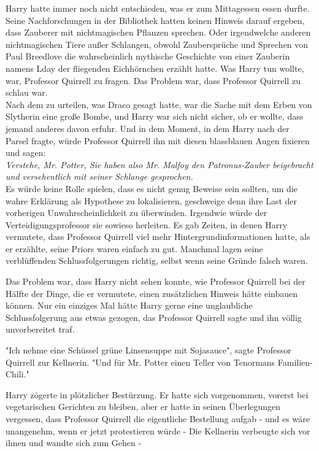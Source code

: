 {Harry hatte immer noch nicht entschieden, was er zum Mittagessen essen durfte. Seine Nachforschungen in der Bibliothek hatten keinen Hinweis darauf ergeben, dass Zauberer mit nichtmagischen Pflanzen sprechen. Oder irgendwelche anderen nichtmagischen Tiere außer Schlangen, obwohl Zaubersprüche und Sprechen von Paul Breedlove die wahrscheinlich mythische Geschichte von einer Zauberin namens Lday der fliegenden Eichhörnchen erzählt hatte. Was Harry tun wollte, war, Professor Quirrell zu fragen. Das Problem war, dass Professor Quirrell zu schlau war.\\ Nach dem zu urteilen, was Draco gesagt hatte, war die Sache mit dem Erben von Slytherin eine große Bombe, und Harry war sich nicht sicher, ob er wollte, dass jemand anderes davon erfuhr. Und in dem Moment, in dem Harry nach der Parsel fragte, würde Professor Quirrell ihn mit diesen blassblauen Augen fixieren und sagen:\\ \emph{Verstehe, Mr. Potter, Sie haben also Mr. Malfoy den Patronus-Zauber beigebracht und versehentlich mit seiner Schlange gesprochen.}\\ Es würde keine Rolle spielen, dass es nicht genug Beweise sein sollten, um die wahre Erklärung als Hypothese zu lokalisieren, geschweige denn ihre Last der vorherigen Unwahrscheinlichkeit zu überwinden. Irgendwie würde der Verteidigungsprofessor sie sowieso herleiten. Es gab Zeiten, in denen Harry vermutete, dass Professor Quirrell viel mehr Hintergrundinformationen hatte, als er erzählte, seine Priors waren einfach zu gut. Manchmal lagen seine verblüffenden Schlussfolgerungen richtig, selbst wenn seine Gründe falsch waren.

Das Problem war, dass Harry nicht sehen konnte, wie Professor Quirrell bei der Hälfte der Dinge, die er vermutete, einen zusätzlichen Hinweis hätte einbauen können. Nur ein einziges Mal hätte Harry gerne eine unglaubliche Schlussfolgerung aus etwas gezogen, das Professor Quirrell sagte und ihn völlig unvorbereitet traf.

"Ich nehme eine Schüssel grüne Linsensuppe mit Sojasauce", sagte Professor Quirrell zur Kellnerin. "Und für Mr. Potter einen Teller von Tenormans Familien-Chili."

Harry zögerte in plötzlicher Bestürzung. Er hatte sich vorgenommen, vorerst bei vegetarischen Gerichten zu bleiben, aber er hatte in seinen Überlegungen vergessen, dass Professor Quirrell die eigentliche Bestellung aufgab - und es wäre unangenehm, wenn er jetzt protestieren würde - Die Kellnerin verbeugte sich vor ihnen und wandte sich zum Gehen -

}
